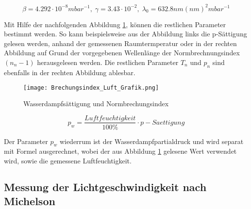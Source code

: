 \begin{equation*}
\beta = 4.292 \cdot 10^{-8} mbar^{-1},\;\gamma = 3.43 \cdot 10^{-2},\;\lambda_{0} = 632.8 nm (nm)^{2}mbar^{-1}
\label{eq:Faktor_Beta}
\end{equation*}

Mit Hilfe der nachfolgenden Abbildung \ref{fig:Wasserdampfsättigung und Normbrechungsindex}, können die restlichen Parameter bestimmt werden. So kann beispielsweise aus der Abbildung links die p-Sättigung gelesen werden, anhand der gemessenen Raumtermperatur oder in der rechten Abbildung auf Grund der vorgegebenen Wellenlänge der Normbrechnungsindex $(n_{n} - 1)$ herausgelesen werden. Die restlichen Parameter $T_{n}$ und $p_{n}$ sind ebenfalls in der rechten Abbildung ablesbar.

\begin{figure}[htb]
\texttt{[image: Brechungsindex\_Luft\_Grafik.png]}
\caption{Wasserdampfsättigung und Normbrechungsindex}
\label{fig:Wasserdampfsättigung und Normbrechungsindex}
\end{figure}

\begin{equation}
p_{w} = \dfrac{Luftfeuchtigkeit}{100\%}\cdot p-Saettigung
\label{eq:Formel_Wasserdampfpartialdruck}
\end{equation}

Der Parameter $p_{w}$ wiederrum ist der Wasserdampfpartialdruck und wird separat mit Formel ausgerechnet, wobei der aus Abbildung \ref{fig:Wasserdampfsättigung und Normbrechungsindex} gelesene Wert verwendet wird, sowie die gemessene Luftfeuchtigkeit.


\subsection{Messung der Lichtgeschwindigkeit nach Michelson}
